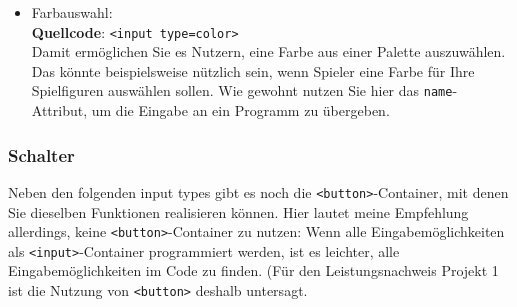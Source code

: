 \begin{itemize}
	\item Farbauswahl:\\
	\textbf{Quellcode}: \verb|<input type=color>|\\
	Damit ermöglichen Sie es Nutzern, eine Farbe aus einer Palette auszuwählen. Das könnte beispielsweise nützlich sein, wenn Spieler eine Farbe für Ihre Spielfiguren auswählen sollen. Wie gewohnt nutzen Sie hier das \verb|name|-Attribut, um die Eingabe an ein Programm zu übergeben. 
\end{itemize}


\subsubsection{Schalter}

Neben den folgenden input types gibt es noch die \verb|<button>|-Container, mit denen Sie dieselben Funktionen realisieren können. Hier lautet meine Empfehlung allerdings, keine \verb|<button>|-Container zu nutzen: Wenn alle Eingabemöglichkeiten als \verb|<input>|-Container programmiert werden, ist es leichter, alle Eingabemöglichkeiten im Code zu finden. (Für den Leistungsnachweis \glqq{}Projekt 1\grqq{} ist die Nutzung von \verb|<button>| deshalb untersagt.

